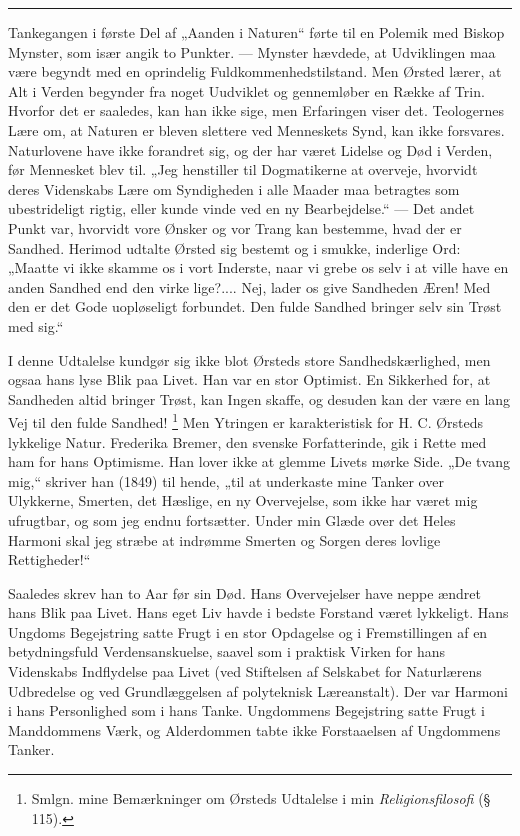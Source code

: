 \documentclass[12pt,a4paper,openany]{book}
\newcommand{\opage}[1]{\marginnote{\footnotesize\textit{[#1]}}}
\begin{document}
\begin{center}\rule{2cm}{0.4pt}\end{center}

Tankegangen i første Del af „Aanden i Naturen“ førte til en Polemik med Biskop
Mynster, som især angik to Punkter. --- Mynster hævdede, at Udviklingen maa
være begyndt med en oprindelig Fuldkommenhedstilstand. Men Ørsted lærer, at Alt
i Verden begynder fra noget Uudviklet og gennemløber en Række af Trin. Hvorfor
det er saaledes, kan han ikke sige, men Erfaringen viser det. Teologernes Lære
om, at Naturen er bleven slettere ved Menneskets Synd, kan ikke forsvares.
Naturlovene have ikke forandret sig, og der har været Lidelse og Død i Verden,
før Mennesket blev til. „Jeg henstiller til Dogmatikerne at overveje, hvorvidt
deres Videnskabs Lære om Syndigheden i alle Maader maa betragtes som
ubestrideligt rigtig, eller kunde vinde ved en ny Bearbejdelse.“ --- Det andet
Punkt var, hvorvidt vore Ønsker og vor Trang kan bestemme, hvad der er Sandhed.
Herimod udtalte Ørsted sig bestemt og i smukke, inderlige Ord: „Maatte vi ikke
skamme os i vort Inderste, naar vi grebe os selv i at ville have en anden
Sandhed end den virke%
\setcounter{footnote}{0}%
\opage{56}lige?.... Nej, lader os give Sandheden Æren! Med den er det Gode
uopløseligt forbundet. Den fulde Sandhed bringer selv sin Trøst med sig.“

I denne Udtalelse kundgør sig ikke blot Ørsteds store Sandhedskærlighed, men
ogsaa hans lyse Blik paa Livet. Han var en stor Optimist. En Sikkerhed for, at
Sandheden altid bringer Trøst, kan Ingen skaffe, og desuden kan der være en
lang Vej til den fulde Sandhed!%
\footnote[1]{Smlgn. mine Bemærkninger om Ørsteds Udtalelse i min
\textit{Religionsfilosofi} (§ 115).} Men Ytringen er karakteristisk for H. C.
Ørsteds lykkelige Natur. Frederika Bremer, den svenske Forfatterinde, gik i
Rette med ham for hans Optimisme. Han lover ikke at glemme Livets mørke Side.
„De tvang mig,“ skriver han (1849) til hende, „til at underkaste mine Tanker
over Ulykkerne, Smerten, det Hæslige, en ny Overvejelse, som ikke har været mig
ufrugtbar, og som jeg endnu fortsætter. Under min Glæde over det Heles Harmoni
skal jeg stræbe at indrømme Smerten og Sorgen deres lovlige Rettigheder!“

Saaledes skrev han to Aar før sin Død. Hans Overvejelser have neppe ændret hans
Blik paa Livet. Hans eget Liv havde i bedste Forstand været lykkeligt. Hans
Ungdoms Begejstring satte Frugt i en stor Opdagelse og i Fremstillingen af en
betydningsfuld Verdensanskuelse, saavel som i praktisk Virken for hans
Videnskabs Indflydelse paa Livet (ved Stiftelsen af Selskabet for Naturlærens
Udbredelse og ved Grundlæggelsen af polyteknisk Læreanstalt). Der var Harmoni i
hans Personlighed som i hans Tanke. Ungdommens Begejstring satte Frugt i
Manddommens Værk, og Alderdommen tabte ikke Forstaaelsen af Ungdommens Tanker.
\end{document}
